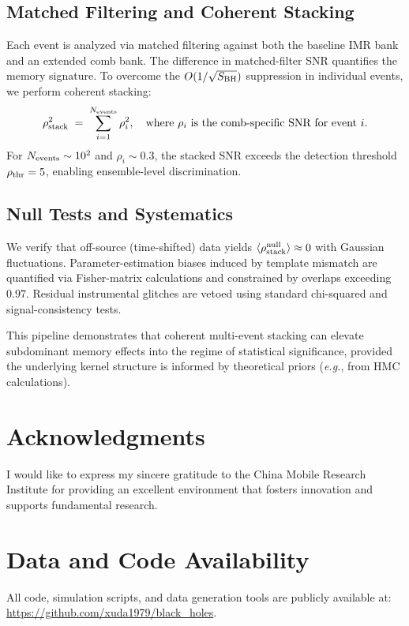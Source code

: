 \documentclass[11pt,a4paper]{article}
\newcommand{\eg}{\textit{e.g.}\xspace}
\newcommand{\HMC}{\textsc{HMC}\xspace}
\theoremstyle{plain}
\theoremstyle{definition}
\theoremstyle{remark}
\begin{document}
\subsection{Matched Filtering and Coherent Stacking}
Each event is analyzed via matched filtering against both the baseline IMR bank and an extended comb bank. The difference in matched-filter SNR quantifies the memory signature. To overcome the $O(1/\sqrt{S_{\rm BH}})$ suppression in individual events, we perform coherent stacking:
\begin{equation}
\rho_{\rm stack}^2\;=\;\sum_{i=1}^{N_{\rm events}}\rho_i^2,
\quad \text{where } \rho_i \text{ is the comb-specific SNR for event } i.
\end{equation}
For $N_{\rm events}\sim 10^2$ and $\rho_i \sim 0.3$, the stacked SNR exceeds the detection threshold $\rho_{\rm thr}=5$, enabling ensemble-level discrimination.

\subsection{Null Tests and Systematics}
We verify that off-source (time-shifted) data yields $\langle \rho_{\rm stack}^{\rm null}\rangle \approx 0$ with Gaussian fluctuations. Parameter-estimation biases induced by template mismatch are quantified via Fisher-matrix calculations and constrained by overlaps exceeding $0.97$. Residual instrumental glitches are vetoed using standard chi-squared and signal-consistency tests.

This pipeline demonstrates that coherent multi-event stacking can elevate subdominant memory effects into the regime of statistical significance, provided the underlying kernel structure is informed by theoretical priors (\eg, from \HMC calculations).


\section*{Acknowledgments}
 
I would like to express my sincere gratitude to the China Mobile Research Institute for 
providing an excellent environment that fosters innovation and supports fundamental research.



\section*{Data and Code Availability}
All code, simulation scripts, and data generation tools are publicly available at:
\url{https://github.com/xuda1979/black_holes}.
\end{document}
